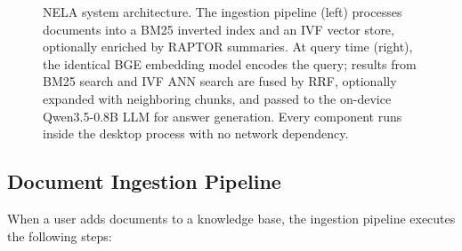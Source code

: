 \documentclass[conference]{IEEEtran}
\begin{document}
\begin{figure}[!t]
\caption{NELA system architecture. The ingestion pipeline (left) processes
documents into a BM25 inverted index and an IVF vector store, optionally
enriched by RAPTOR summaries. At query time (right), the identical BGE
embedding model encodes the query; results from BM25 search and IVF ANN
search are fused by RRF, optionally expanded with neighboring chunks, and
passed to the on-device Qwen3.5-0.8B LLM for answer generation. Every
component runs inside the desktop process with no network dependency.}
\label{fig:arch}
\end{figure}

\subsection{Document Ingestion Pipeline}
When a user adds documents to a knowledge base, the ingestion pipeline
executes the following steps:
\end{document}
